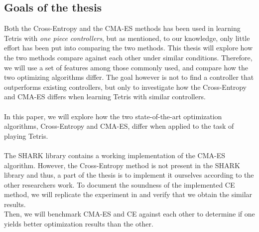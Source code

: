 \subsection{Goals of the thesis}

Both the Cross-Entropy and the CMA-ES methods has been used 
in learning Tetris with \textit{one piece controllers}, but as 
mentioned, to our knowledge, only little effort has been put into 
comparing the two methods. This thesis will explore
how the two methods compare against each other under similar
conditions. Therefore, we will use a set of features among those
commonly used, and compare how the two optimizing algorithms 
differ. The goal however is not to find a controller that 
outperforms existing controllers, but only to investigate 
how the Cross-Entropy and CMA-ES differs when learning Tetris
with similar controllers.\\
\\
In this paper, we will explore how the two state-of-the-art
optimization algorithms, Cross-Entropy and CMA-ES, differ when 
applied to the task of playing Tetris.\\
\\
The SHARK library \citep{shark08} contains a
working implementation of the CMA-ES 
algorithm. However, the Cross-Entropy method 
is not present in the SHARK library and thus, 
a part of the thesis is to implement it ourselves according to 
the other researchers work. To document the 
soundness of the implemented CE method, 
we will replicate the experiment in \citep{thiery:09} and 
verify that we obtain the similar results.\\
Then, we will benchmark CMA-ES and CE against each other 
to determine if one yields better optimization results than the other.
